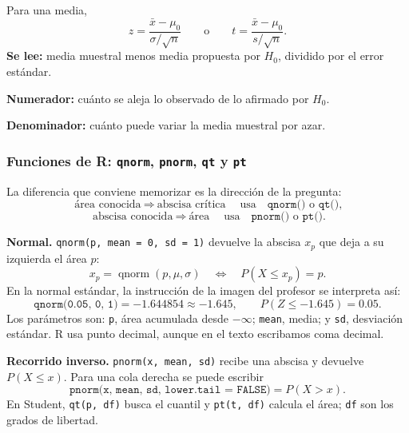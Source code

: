 \documentclass[11pt,a4paper]{article}
\begin{document}
\begin{leerformula}
Para una media,
\[
z=\frac{\bar{x}-\mu_0}{\sigma/\sqrt n}
\qquad\text{o}\qquad
t=\frac{\bar{x}-\mu_0}{s/\sqrt n}.
\]
\textbf{Se lee:} media muestral menos media propuesta por $H_0$, dividido por el error estándar.\par
\textbf{Numerador:} cuánto se aleja lo observado de lo afirmado por $H_0$.\par
\textbf{Denominador:} cuánto puede variar la media muestral por azar.
\end{leerformula}

\subsubsection{\texorpdfstring{Funciones de R: \texttt{qnorm}, \texttt{pnorm}, \texttt{qt} y \texttt{pt}}{Funciones de R para cuantiles y probabilidades}}

La diferencia que conviene memorizar es la dirección de la pregunta:
\[
\boxed{\text{área conocida}\ \Longrightarrow\ \text{abscisa crítica}}
\quad\text{usa}\quad \boxed{\texttt{qnorm()}\text{ o }\texttt{qt()}},
\]
\[
\boxed{\text{abscisa conocida}\ \Longrightarrow\ \text{área}}
\quad\text{usa}\quad \boxed{\texttt{pnorm()}\text{ o }\texttt{pt()}}.
\]

\begin{calculor}
\textbf{Normal.} \texttt{qnorm(p, mean = 0, sd = 1)} devuelve la abscisa $x_p$ que deja a su izquierda el área $p$:
\[
x_p=\operatorname{qnorm}(p,\mu,\sigma)
\quad\Longleftrightarrow\quad
P(X\le x_p)=p.
\]
En la normal estándar, la instrucción de la imagen del profesor se interpreta así:
\[
\texttt{qnorm(0.05, 0, 1)}=-1.644854\approx-1.645,
\qquad P(Z\le-1.645)=0.05.
\]
Los parámetros son: \texttt{p}, área acumulada desde $-\infty$; \texttt{mean}, media; y \texttt{sd}, desviación estándar. R usa punto decimal, aunque en el texto escribamos coma decimal.
\end{calculor}

\begin{calculor}
\textbf{Recorrido inverso.} \texttt{pnorm(x, mean, sd)} recibe una abscisa y devuelve $P(X\le x)$. Para una cola derecha se puede escribir
\[
\texttt{pnorm(x, mean, sd, lower.tail = FALSE)}=P(X>x).
\]
En Student, \texttt{qt(p, df)} busca el cuantil y \texttt{pt(t, df)} calcula el área; \texttt{df} son los grados de libertad.
\end{calculor}
\end{document}
